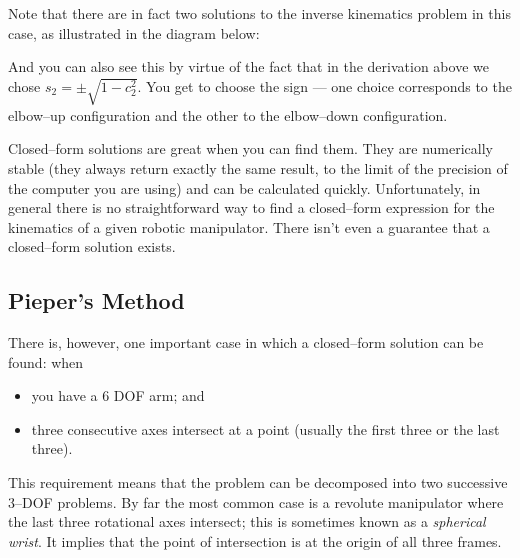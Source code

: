\documentclass[]{article}
\begin{document}
Note that there are in fact two solutions to the inverse kinematics problem in this case, as illustrated in the diagram below:
 
\begin{figure}[h!]
 	\centering
 \end{figure}

And you can also see this by virtue of the fact that in the derivation above we chose $s_{2} = \pm \sqrt{1-c_{2}^{2}}$. You get to choose the sign --- one choice corresponds to the elbow--up configuration and the other to the elbow--down configuration.

Closed--form solutions are great when you can find them. They are numerically stable (they always return exactly the same result, to the limit of the precision of the computer you are using) and can be calculated quickly. Unfortunately, in general there is no straightforward way to find a closed--form expression for the kinematics of a given robotic manipulator. There isn't even a guarantee that a closed--form solution exists.

 
\subsection{Pieper's Method}
 There is, however, one important case in which a closed--form solution can be found: when \begin{itemize} \item you have a 6 DOF arm; and \item three consecutive axes intersect at a point (usually the first three or the last three).\end{itemize}
 This requirement means that the problem can be decomposed into two successive 3--DOF problems. By far the most common case is a revolute manipulator where the last three rotational axes intersect; this is sometimes known as a \textit{spherical wrist}. It implies that the point of intersection is at the origin of all three frames.
 
\end{document}
